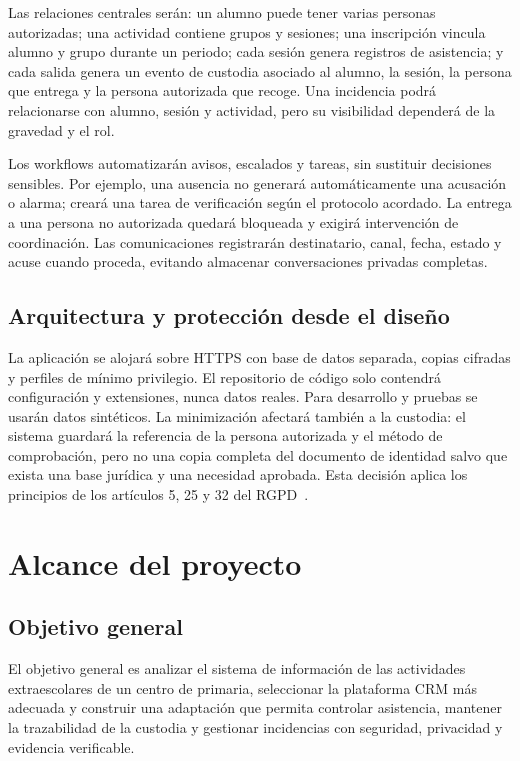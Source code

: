 Las relaciones centrales serán: un alumno puede tener varias personas autorizadas; una actividad contiene grupos y sesiones; una inscripción vincula alumno y grupo durante un periodo; cada sesión genera registros de asistencia; y cada salida genera un evento de custodia asociado al alumno, la sesión, la persona que entrega y la persona autorizada que recoge. Una incidencia podrá relacionarse con alumno, sesión y actividad, pero su visibilidad dependerá de la gravedad y el rol.

Los workflows automatizarán avisos, escalados y tareas, sin sustituir decisiones sensibles. Por ejemplo, una ausencia no generará automáticamente una acusación o alarma; creará una tarea de verificación según el protocolo acordado. La entrega a una persona no autorizada quedará bloqueada y exigirá intervención de coordinación. Las comunicaciones registrarán destinatario, canal, fecha, estado y acuse cuando proceda, evitando almacenar conversaciones privadas completas.

\subsection{Arquitectura y protección desde el diseño}\label{sec:1-2-8}

La aplicación se alojará sobre HTTPS con base de datos separada, copias cifradas y perfiles de mínimo privilegio. El repositorio de código solo contendrá configuración y extensiones, nunca datos reales. Para desarrollo y pruebas se usarán datos sintéticos. La minimización afectará también a la custodia: el sistema guardará la referencia de la persona autorizada y el método de comprobación, pero no una copia completa del documento de identidad salvo que exista una base jurídica y una necesidad aprobada. Esta decisión aplica los principios de los artículos 5, 25 y 32 del RGPD~\cite{ref03}.

\section{Alcance del proyecto}\label{sec:1-3}

\subsection{Objetivo general}\label{sec:1-3-1}

El objetivo general es analizar el sistema de información de las actividades extraescolares de un centro de primaria, seleccionar la plataforma CRM más adecuada y construir una adaptación que permita controlar asistencia, mantener la trazabilidad de la custodia y gestionar incidencias con seguridad, privacidad y evidencia verificable.

